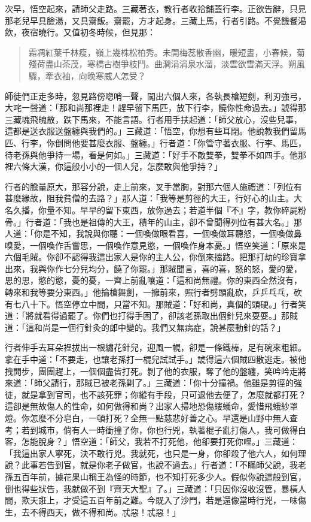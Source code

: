次早，悟空起來，請師父走路。三藏著衣，教行者收拾鋪蓋行李。正欲告辭，只見那老兒早具臉湯，又具齋飯。齋罷，方才起身。三藏上馬，行者引路。不覺饑餐渴飲，夜宿曉行。又值初冬時候，但見那：
\begin{quote}
霜凋紅葉千林瘦，嶺上幾株松柏秀。未開梅蕊散香幽，暖短晝，小春候，菊殘荷盡山茶茂，寒橋古樹爭枝鬥。曲澗涓涓泉水溜，淡雲欲雪滿天浮。朔風驟，牽衣袖，向晚寒威人怎受？
\end{quote}

師徒們正走多時，忽見路傍唿哨一聲，闖出六個人來，各執長槍短劍，利刃強弓，大咤一聲道：「那和尚那裡走！趕早留下馬匹，放下行李，饒你性命過去。」諕得那三藏魂飛魄散，跌下馬來，不能言語。行者用手扶起道：「師父放心，沒些兒事，這都是送衣服送盤纏與我們的。」三藏道：「悟空，你想有些耳閉。他說教我們留馬匹、行李，你倒問他要甚麼衣服、盤纏。」行者道：「你管守著衣服、行李、馬匹，待老孫與他爭持一場，看是何如。」三藏道：「好手不敵雙拳，雙拳不如四手。他那裡六條大漢，你這般小小的一個人兒，怎麼敢與他爭持？」

行者的膽量原大，那容分說，走上前來，叉手當胸，對那六個人施禮道：「列位有甚麼緣故，阻我貧僧的去路？」那人道：「我等是剪徑的大王，行好心的山主。大名久播，你量不知。早早的留下東西，放你過去；若道半個『不』字，教你碎屍粉骨。」行者道：「我也是祖傳的大王，積年的山主，卻不曾聞得列位有甚大名。」那人道：「你是不知，我說與你聽：一個喚做眼看喜，一個喚做耳聽怒，一個喚做鼻嗅愛，一個喚作舌嘗思，一個喚作意見慾，一個喚作身本憂。」悟空笑道：「原來是六個毛賊。你卻不認得我這出家人是你的主人公，你倒來擋路。把那打劫的珍寶拿出來，我與你作七分兒均分，饒了你罷。」那賊聞言，喜的喜，怒的怒，愛的愛，思的思，慾的慾，憂的憂，一齊上前亂嚷道：「這和尚無禮。你的東西全然沒有，轉來和我等要分東西。」他掄槍舞劍，一擁前來，照行者劈頭亂砍，乒乒乓乓，砍有七八十下。悟空停立中間，只當不知。那賊道：「好和尚，真個的頭硬。」行者笑道：「將就看得過罷了。你們也打得手困了，卻該老孫取出個針兒來耍耍。」那賊道：「這和尚是一個行針灸的郎中變的。我們又無病症，說甚麼動針的話？」

行者伸手去耳朵裡拔出一根繡花針兒，迎風一幌，卻是一條鐵棒，足有碗來粗細。拿在手中道：「不要走，也讓老孫打一棍兒試試手。」諕得這六個賊四散逃走。被他拽開步，團團趕上，一個個盡皆打死。剝了他的衣服，奪了他的盤纏，笑吟吟走將來道：「師父請行，那賊已被老孫剿了。」三藏道：「你十分撞禍。他雖是剪徑的強徒，就是拿到官司，也不該死罪；你縱有手段，只可退他去便了，怎麼就都打死？這卻是無故傷人的性命，如何做得和尚？出家人掃地恐傷螻蟻命，愛惜飛蛾紗罩燈。你怎麼不分皂白，一頓打死？全無一點慈悲好善之心。早還是山野中無人查考；若到城市，倘有人一時衝撞了你，你也行兇，執著棍子亂打傷人，我可做得白客，怎能脫身？」悟空道：「師父，我若不打死他，他卻要打死你哩。」三藏道：「我這出家人寧死，決不敢行兇。我就死，也只是一身，你卻殺了他六人，如何理說？此事若告到官，就是你老子做官，也說不過去。」行者道：「不瞞師父說，我老孫五百年前，據花果山稱王為怪的時節，也不知打死多少人。假似你說這般到官，倒也得些狀告，我就做不到『齊天大聖』了。」三藏道：「只因你沒收沒管，暴橫人間，欺天誑上，才受這五百年前之難。今既入了沙門，若是還像當時行兇，一味傷生，去不得西天，做不得和尚。忒惡！忒惡！」

